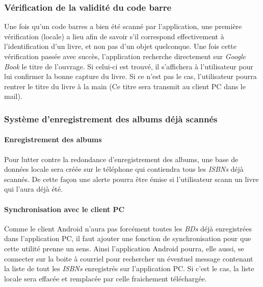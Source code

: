 \subsubsection{Vérification de la validité du code barre}
Une fois qu'un code barres a bien été scanné par l'application, 
	 une première vérification (locale) a lieu afin de savoir s'il correspond effectivement à l'identification d'un livre, et non pas d'un objet quelconque. 
Une fois cette vérification passée avec succès, l'application recherche directement sur \emph{Google Book} le titre de l'ouvrage. Si celui-ci est trouvé, il s'affichera à l'utilisateur pour lui confirmer la bonne capture du livre. 
Si ce n'est pas le cas, l'utilisateur pourra rentrer le titre du livre à la main (Ce titre sera transmit au client PC dans le mail). 

\subsubsection{Système d'enregistrement des albums déjà scannés}

\paragraph{Enregistrement des albums}
Pour lutter contre la redondance d'enregistrement des albums, une base de données locale sera créée sur le téléphone qui contiendra tous les \emph{ISBNs} déjà scannés. 
De cette façon une alerte pourra être émise si l'utilisateur scann un livre qui l'aura déjà été. 

\paragraph{Synchronisation avec le client PC}
Comme le client Android n'aura pas forcément toutes les \emph{BDs} déjà enregistrées dans l'application PC, 
il faut ajouter une fonction de synchronisation pour que cette utilité prenne un sens.
Ainsi l'application Android pourra, elle aussi, se connecter sur la boite à courriel pour rechercher un éventuel message contenant la liste de tout les \emph{ISBNs} enregistrés sur l'application PC. 
Si c'est le cas, la liste locale sera effacée et remplacée par celle fraichement téléchargée.
